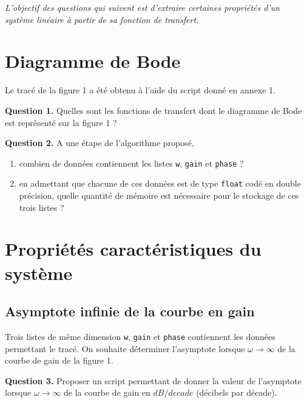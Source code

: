 \documentclass[11pt,fleqn]{book} %
\begin{document}
\begin{dBox}
\textit{L'objectif des questions qui suivent est d'extraire certaines propriétés d'un système linéaire à partir de sa fonction de transfert.}
\end{dBox}

\section{Diagramme de Bode}

Le tracé de la figure 1 a été obtenu à l'aide du script donné en annexe 1.

\begin{tBox}
\textbf{Question 1.} Quelles sont les fonctions de transfert dont le diagramme de Bode est représenté sur la figure 1 ?
\end{tBox}

\begin{tBox}
\textbf{Question 2.} A une étape de l'algorithme proposé, 
\begin{enumerate}
\item combien de données contiennent les listes \texttt{w}, \texttt{gain} et \texttt{phase} ?
\item en admettant que chacune de ces données est de type \texttt{float} codé en double précision, quelle quantité de mémoire est nécessaire pour le stockage de ces trois listes ?
\end{enumerate}

\end{tBox}


\section{Propriétés caractéristiques du système}

\subsection{Asymptote infinie de la courbe en gain}

Trois listes de même dimension \texttt{w}, \texttt{gain} et \texttt{phase} contiennent les données permettant le tracé.
On souhaite déterminer l'asymptote lorsque $\omega \to \infty$ de la courbe de gain de la figure 1. 

\begin{tBox}
\textbf{Question 3.} Proposer un script permettant de donner la valeur de l'asymptote lorsque $\omega \to \infty$ de la courbe de gain en $dB/decade$ (décibels par décade).
\end{tBox}
\end{document}
